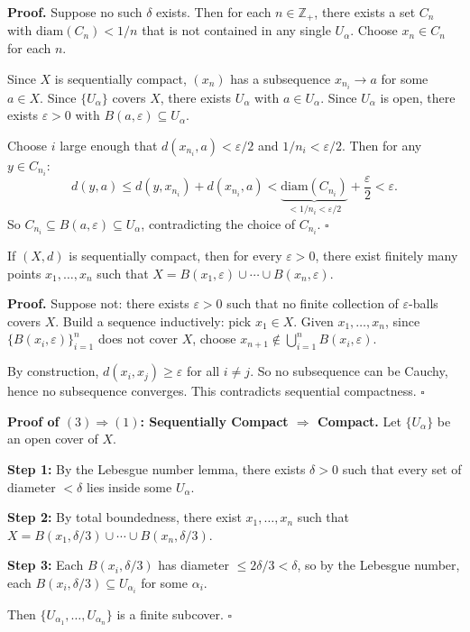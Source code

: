 \documentclass[11pt]{report}
\renewenvironment{proof}[1][Proof]{\noindent\textbf{#1.} }{\hfill$\square$\par\vspace{5pt}}
\begin{document}
\begin{proof}
Suppose no such $\delta$ exists. Then for each $n \in \mathbb{Z}_+$, there exists a set $C_n$ with $\text{diam}(C_n) < 1/n$ that is not contained in any single $U_\alpha$. Choose $x_n \in C_n$ for each $n$.

Since $X$ is sequentially compact, $(x_n)$ has a subsequence $x_{n_i} \to a$ for some $a \in X$. Since $\{U_\alpha\}$ covers $X$, there exists $U_\alpha$ with $a \in U_\alpha$. Since $U_\alpha$ is open, there exists $\varepsilon > 0$ with $B(a, \varepsilon) \subseteq U_\alpha$.

Choose $i$ large enough that $d(x_{n_i}, a) < \varepsilon/2$ and $1/n_i < \varepsilon/2$. Then for any $y \in C_{n_i}$:
\[d(y, a) \leq d(y, x_{n_i}) + d(x_{n_i}, a) < \underbrace{\text{diam}(C_{n_i})}_{< 1/n_i < \varepsilon/2} + \frac{\varepsilon}{2} < \varepsilon.\]
So $C_{n_i} \subseteq B(a, \varepsilon) \subseteq U_\alpha$, contradicting the choice of $C_{n_i}$.
\end{proof}

\begin{lembox}
If $(X, d)$ is sequentially compact, then for every $\varepsilon > 0$, there exist finitely many points $x_1, \ldots, x_n$ such that $X = B(x_1, \varepsilon) \cup \cdots \cup B(x_n, \varepsilon)$.
\end{lembox}

\begin{proof}
Suppose not: there exists $\varepsilon > 0$ such that no finite collection of $\varepsilon$-balls covers $X$. Build a sequence inductively: pick $x_1 \in X$. Given $x_1, \ldots, x_n$, since $\{B(x_i, \varepsilon)\}_{i=1}^n$ does not cover $X$, choose $x_{n+1} \notin \bigcup_{i=1}^n B(x_i, \varepsilon)$.

By construction, $d(x_i, x_j) \geq \varepsilon$ for all $i \neq j$. So no subsequence can be Cauchy, hence no subsequence converges. This contradicts sequential compactness.
\end{proof}

\begin{proof}[Proof of $(3) \Rightarrow (1)$: Sequentially Compact $\Rightarrow$ Compact]
Let $\{U_\alpha\}$ be an open cover of $X$.

\textbf{Step 1:} By the Lebesgue number lemma, there exists $\delta > 0$ such that every set of diameter $< \delta$ lies inside some $U_\alpha$.

\textbf{Step 2:} By total boundedness, there exist $x_1, \ldots, x_n$ such that $X = B(x_1, \delta/3) \cup \cdots \cup B(x_n, \delta/3)$.

\textbf{Step 3:} Each $B(x_i, \delta/3)$ has diameter $\leq 2\delta/3 < \delta$, so by the Lebesgue number, each $B(x_i, \delta/3) \subseteq U_{\alpha_i}$ for some $\alpha_i$.

Then $\{U_{\alpha_1}, \ldots, U_{\alpha_n}\}$ is a finite subcover.
\end{proof}
\end{document}

